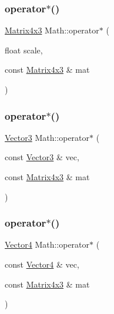 \mbox{\label{namespace_math_ab554e261e8209bde30f33f893c0f2bbb}} 
\subsubsection{\texorpdfstring{operator$\ast$()}{operator*()}\hspace{0.1cm}{\footnotesize\ttfamily [14/19]}}
{\footnotesize\ttfamily \mbox{\hyperlink{struct_math_1_1_matrix4x3}{Matrix4x3}} Math\+::operator$\ast$ (\begin{DoxyParamCaption}\item[{float}]{scale,  }\item[{const \mbox{\hyperlink{struct_math_1_1_matrix4x3}{Matrix4x3}} \&}]{mat }\end{DoxyParamCaption})}

\mbox{\label{namespace_math_abaac4a662eebe65536e53580498f7377}} 
\subsubsection{\texorpdfstring{operator$\ast$()}{operator*()}\hspace{0.1cm}{\footnotesize\ttfamily [15/19]}}
{\footnotesize\ttfamily \mbox{\hyperlink{struct_math_1_1_vector3}{Vector3}} Math\+::operator$\ast$ (\begin{DoxyParamCaption}\item[{const \mbox{\hyperlink{struct_math_1_1_vector3}{Vector3}} \&}]{vec,  }\item[{const \mbox{\hyperlink{struct_math_1_1_matrix4x3}{Matrix4x3}} \&}]{mat }\end{DoxyParamCaption})}

\mbox{\label{namespace_math_ad610b35195c92a20ff2913aaa5c14f4c}} 
\subsubsection{\texorpdfstring{operator$\ast$()}{operator*()}\hspace{0.1cm}{\footnotesize\ttfamily [16/19]}}
{\footnotesize\ttfamily \mbox{\hyperlink{struct_math_1_1_vector4}{Vector4}} Math\+::operator$\ast$ (\begin{DoxyParamCaption}\item[{const \mbox{\hyperlink{struct_math_1_1_vector4}{Vector4}} \&}]{vec,  }\item[{const \mbox{\hyperlink{struct_math_1_1_matrix4x3}{Matrix4x3}} \&}]{mat }\end{DoxyParamCaption})}

